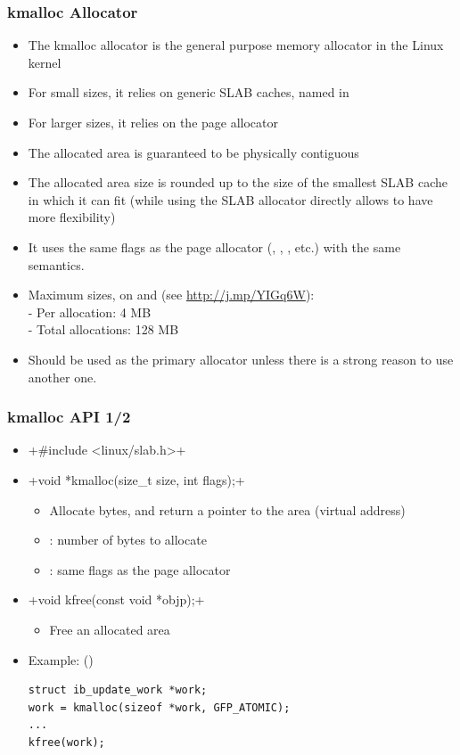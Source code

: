\begin{frame}
  \frametitle{kmalloc Allocator}
  \begin{itemize}
  \item The kmalloc allocator is the general purpose memory allocator
    in the Linux kernel
  \item For small sizes, it relies on generic SLAB caches, named
     in 
  \item For larger sizes, it relies on the page allocator
  \item The allocated area is guaranteed to be physically contiguous
  \item The allocated area size is rounded up to the size of the
        smallest SLAB cache in which it can fit 
        (while using the SLAB allocator directly allows to have more
        flexibility)
  \item It uses the same flags as the page allocator (,
    , , etc.) with the same semantics.
  \item Maximum sizes, on  and  (see
    \url{http://j.mp/YIGq6W}): \\
    - Per allocation: 4 MB \\
    - Total allocations: 128 MB
  \item Should be used as the primary allocator unless there is a
    strong reason to use another one.
  \end{itemize}
\end{frame}

\begin{frame}[fragile]
  \frametitle{kmalloc API 1/2}
  \begin{itemize}
  \item {}+#include <linux/slab.h>+
  \item {}+void *kmalloc(size_t size, int flags);+
    \begin{itemize}
    \item Allocate  bytes, and return a pointer to the area
      (virtual address)
    \item {}: number of bytes to allocate
    \item {}: same flags as the page allocator
    \end{itemize}
  \item {}+void kfree(const void *objp);+
    \begin{itemize}
    \item Free an allocated area
    \end{itemize}
  \item Example: ()
\begin{verbatim}
struct ib_update_work *work;
work = kmalloc(sizeof *work, GFP_ATOMIC);
...
kfree(work);
\end{verbatim}
  \end{itemize}
\end{frame}

